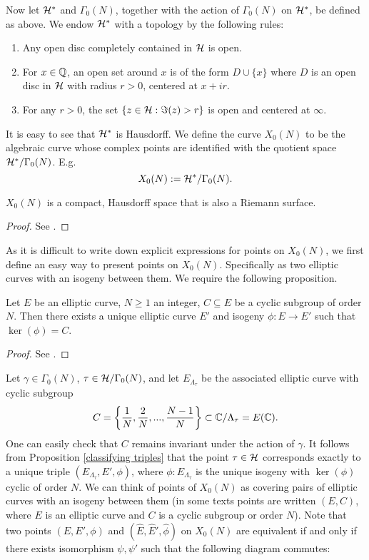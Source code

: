 Now let $\mathcal{H}^*$ and $\Gamma_0(N)$, together with the action of $\Gamma_0(N)$ on $\mathcal{H}^*$, be defined as above. We endow $\mathcal{H}^*$ with a topology by the following rules:
\begin{enumerate}
\item{} Any open disc completely contained in $\mathcal{H}$ is open.
\item{} For $x \in \mathbb{Q}$, an open set around $x$ is of the form $D \cup \{x\}$ where $D$ is an open disc in $\mathcal{H}$ with radius $r > 0$, centered at $x + ir$.
\item{} For any $r > 0$, the set $\{z \in \mathcal{H}: \Im(z) > r\}$ is open and centered at $\infty$.
\end{enumerate}
It is easy to see that $\mathcal{H}^*$ is Hausdorff. We define the curve $X_0(N)$ to be the algebraic curve whose complex points are identified with the quotient space $\mathcal{H}^*/\Gamma_0(N)$. E.g.
$$X_0(N) := \mathcal{H}^*/\Gamma_0(N).$$
\begin{prop}
$X_0(N)$ is a compact, Hausdorff space that is also a Riemann surface.
\end{prop}
\begin{proof}
See \cite[Pages 311 and 333] {Knapp}.
\end{proof}
As it is difficult to write down explicit expressions for points on $X_0(N)$, we first define an easy way to present points on $X_0(N)$. Specifically as two elliptic curves with an isogeny between them. We require the following proposition. 
\begin{prop}\label{classifying triples}
Let $E$ be an elliptic curve, $N \geq 1$ an integer, $C \subseteq E$ be a cyclic subgroup of order $N$. Then there exists a unique elliptic curve $E'$ and isogeny $\phi:E \to E'$ such that $\ker(\phi) = C$.
\end{prop} 
\begin{proof}
See \cite[Page 74]{Silverman}.
\end{proof}
Let $\gamma \in \Gamma_0(N)$, $\tau \in \mathcal{H}/\Gamma_0(N)$, and let $E_{\Lambda_\tau}$ be the associated elliptic curve with cyclic subgroup
$$C = \left\{\frac{1}{N},\frac{2}{N},...,\frac{N-1}{N} \right\} \subset \mathbb{C}/\Lambda_\tau = E(\mathbb{C}).$$
One can easily check that $C$ remains invariant under the action of $\gamma$. It follows from Proposition \ref{classifying triples} that the point $\tau \in \mathcal{H}$ corresponds exactly to a unique triple $(E_{\Lambda_\tau},E',\phi)$, where $\phi:E_{\Lambda_\tau}$ is the unique isogeny with $\ker(\phi)$ cyclic of order $N$. We can think of points of $X_0(N)$ as covering pairs of elliptic curves with an isogeny between them (in some texts points are written $(E,C)$, where $E$ is an elliptic curve and $C$ is a cyclic subgroup or order $N$). Note that two points $(E,E',\phi)$ and $(\hat{E},\hat{E}',\hat{\phi})$  on $X_0(N)$ are equivalent if and only if there exists isomorphism $\psi,\psi'$ such that the following diagram commutes:
